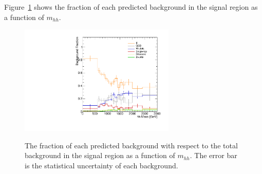 Figure~\ref{fig:boosted_bkgdcomposition_sr_hhmass} shows the fraction of each predicted background in the signal region 
as a function of $m_{hh}$.

\begin{figure}[!h]
\begin{center}
\includegraphics*[width=0.66\textwidth]{./figures/boosted/BkgdComposition/Quick_Composition_SR_Rebin}\\
\caption{The fraction of each predicted background with respect to the total background
in the signal region as a function of $m_{hh}$. The error bar is the statistical uncertainty of 
each background.}
\label{fig:boosted_bkgdcomposition_sr_hhmass}
\end{center}
\end{figure}
